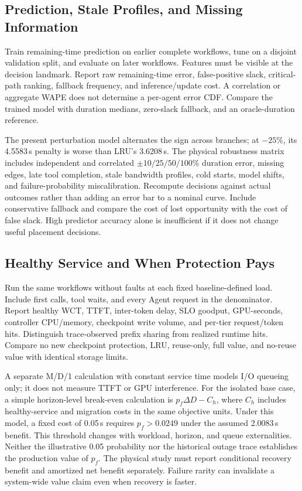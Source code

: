 \documentclass[sigplan,10pt,anonymous,nonacm]{acmart}
\begin{document}
\FloatBarrier
\subsection{Prediction, Stale Profiles, and Missing Information}

Train remaining-time prediction on earlier complete workflows, tune on
a disjoint validation split, and evaluate on later workflows. Features
must be visible at the decision landmark. Report raw remaining-time
error, false-positive slack, critical-path ranking, fallback frequency,
and inference/update cost. A correlation or aggregate WAPE does not
determine a per-agent error CDF. Compare the trained model with duration
medians, zero-slack fallback, and an oracle-duration reference.

The present perturbation model alternates the sign across branches;
at $-25\%$, its 4.5583\,s penalty is worse than LRU's 3.6208\,s.
The physical robustness matrix includes independent and correlated
$\pm10/25/50/100\%$ duration error, missing edges, late tool completion,
stale bandwidth profiles, cold starts, model shifts, and failure-probability
miscalibration. Recompute decisions against actual outcomes rather than
adding an error bar to a nominal curve. Include conservative fallback
and compare the cost of lost opportunity with the cost of false slack.
High predictor accuracy alone is insufficient if it does not change
useful placement decisions.

\FloatBarrier
\subsection{Healthy Service and When Protection Pays}

Run the same workflows without faults at each fixed baseline-defined
load. Include first calls, tool waits, and every Agent request in the
denominator. Report healthy WCT, TTFT, inter-token delay, SLO goodput,
GPU-seconds, controller CPU/memory, checkpoint write volume, and per-tier
request/token hits. Distinguish trace-observed prefix sharing from
realized runtime hits. Compare no new checkpoint protection, LRU,
reuse-only, full value, and no-reuse value with identical storage limits.

A separate M/D/1 calculation with constant service time models I/O queueing only; it does not measure TTFT or GPU interference. For the isolated base case, a simple horizon-level
break-even calculation is $p_f\Delta D-C_h$, where $C_h$ includes
healthy-service and migration costs in the same objective units.
Under this model, a fixed cost of 0.05\,s
requires $p_f>0.0249$ under the assumed 2.0083\,s benefit. This threshold
changes with workload, horizon, and queue externalities. Neither the
illustrative 0.05 probability nor the historical outage trace establishes
the production value of $p_f$. The physical study must report conditional
recovery benefit and amortized net benefit separately. Failure rarity
can invalidate a system-wide value claim even when recovery is faster.
\end{document}
